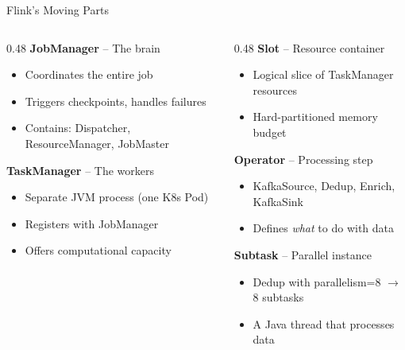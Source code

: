 \documentclass[aspectratio=169]{beamer}
\begin{document}
\begin{frame}{Flink's Moving Parts}
    \begin{columns}[T]
        \begin{column}{0.48\textwidth}
            \textbf{JobManager} -- The brain
            \begin{itemize}
                \item Coordinates the entire job
                \item Triggers checkpoints, handles failures
                \item Contains: Dispatcher, ResourceManager, JobMaster
            \end{itemize}

            \vspace{0.2cm}
            \textbf{TaskManager} -- The workers
            \begin{itemize}
                \item Separate JVM process (one K8s Pod)
                \item Registers with JobManager
                \item Offers computational capacity
            \end{itemize}
        \end{column}
        \begin{column}{0.48\textwidth}
            \textbf{Slot} -- Resource container
            \begin{itemize}
                \item Logical slice of TaskManager resources
                \item Hard-partitioned memory budget
            \end{itemize}

            \vspace{0.2cm}
            \textbf{Operator} -- Processing step
            \begin{itemize}
                \item KafkaSource, Dedup, Enrich, KafkaSink
                \item Defines \textit{what} to do with data
            \end{itemize}

            \vspace{0.2cm}
            \textbf{Subtask} -- Parallel instance
            \begin{itemize}
                \item Dedup with parallelism=8 $\rightarrow$ 8 subtasks
                \item A Java thread that processes data
            \end{itemize}
        \end{column}
    \end{columns}
\end{frame}
\end{document}
